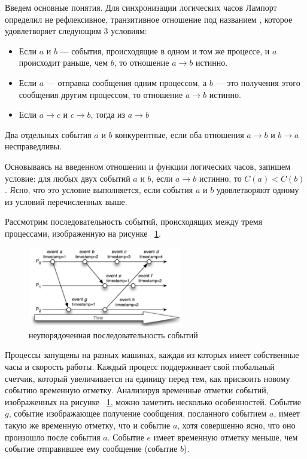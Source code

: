 Введем основные понятия. 
Для синхронизации логических часов Лампорт определил  не рефлексивное, транзитивное отношение под названием , которое удовлетворяет следующим 3 условиям: 
\begin{itemize}
\item Если $a$ и $b$ — события, происходящие в одном и том же процессе, и $a$
           происходит раньше, чем $b$, то отношение $a \rightarrow b$ истинно.
\item Если $a$ --- отправка сообщения одним процессом, а $b$ --- это получения этого сообщения другим процессом, то отношение $a \rightarrow b$ истинно.
\item Если $a \rightarrow c$ и $c \rightarrow b$, тогда из $a \rightarrow b$
\end{itemize}
Два отдельных события $a$ и $b$ конкурентные, если оба отношения $a \rightarrow b$ и $b \rightarrow a$ несправедливы.

Основываясь на введенном отношении и функции логических часов, запишем условие:
для любых двух событий $a$ и $b$, если $a \rightarrow b$ истинно, то $C(a) < C(b)$. Ясно, что это условие выполняется, если  события $a$ и $b$ удовлетворяют одному из условий перечисленных выше.

Рассмотрим последовательность событий, происходящих между тремя процессами, изображенную на рисунке ~\ref{fig:lamport1}.
\begin{figure}
\centering

\includegraphics[width=0.6\textwidth]{img/lamport1.png}
\caption{неупорядоченная последовательность событий}
\label{fig:lamport1}
\end{figure}
Процессы запущены на разных машинах, каждая из которых имеет собственные часы и скорость работы. Каждый процесс поддерживает свой глобальный счетчик, который увеличивается на единицу перед тем, как присвоить новому событию временную отметку. Анализируя временные отметки событий, изображенных на рисунке ~\ref{fig:lamport1}, можно заметить несколько особенностей. Событие $g$, событие изображающее получение сообщения, посланного событием $a$, имеет такую же временную отметку, что и событие $a$, хотя совершенно ясно, что оно произошло после события $a$. Событие $e$ имеет  временную отметку меньше, чем событие отправившее ему сообщение (событие $b$).

